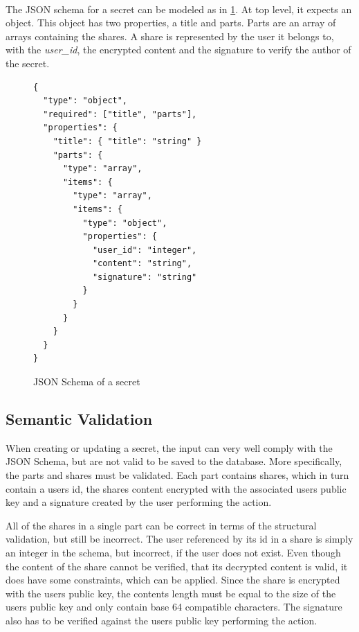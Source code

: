 \paragraph{}{ 
  
  The JSON schema for a secret can be modeled as in
  \ref{code:secret_JSON_schema}. At top level, it expects an object. This
  object has two properties, a title and parts. Parts are an array of arrays
  containing the shares. A share is represented by the user it belongs to, with
  the \textit{user\_id}, the encrypted content and the signature to verify the
  author of the secret.

}

\begin{figure}
\begin{lstlisting}
{
  "type": "object",
  "required": ["title", "parts"],
  "properties": {
    "title": { "title": "string" }
    "parts": {
      "type": "array",
      "items": {
        "type": "array",
        "items": {
          "type": "object",
          "properties": {
            "user_id": "integer",
            "content": "string",
            "signature": "string"
          }
        }
      }
    }
  }
}
\end{lstlisting}
\caption{JSON Schema of a secret}
\label{code:secret_JSON_schema}
\end{figure}

\subsection{Semantic Validation}

When creating or updating a secret, the input can very well comply with the
JSON Schema, but are not valid to be saved to the database. More specifically,
the parts and shares must be validated. Each part contains shares, which in
turn contain a users id, the shares content encrypted with the associated users
public key and a signature created by the user performing the action.

All of the shares in a single part can be correct in terms of the structural
validation, but still be incorrect. The user referenced by its id in a share is
simply an integer in the schema, but incorrect, if the user does not exist.
Even though the content of the share cannot be verified, that its decrypted
content is valid, it does have some constraints, which can be applied. Since
the share is encrypted with the users public key, the contents length must be
equal to the size of the users public key and only contain base 64 compatible
characters. The signature also has to be verified against the users public key
performing the action.

